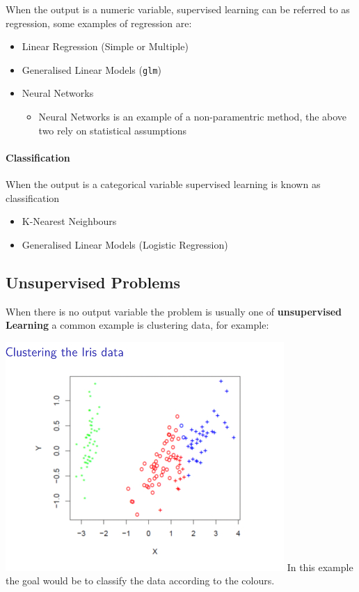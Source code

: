\documentclass[]{book}
\providecommand{\tightlist}{%
  \setlength{\itemsep}{0pt}\setlength{\parskip}{0pt}}
\let\oldparagraph\paragraph
\renewcommand{\paragraph}[1]{\oldparagraph{#1}\mbox{}}
\begin{document}
When the output is a numeric variable, supervised learning can be
referred to as regression, some examples of regression are:

\begin{itemize}
\tightlist
\item
  Linear Regression (Simple or Multiple)
\item
  Generalised Linear Models (\texttt{glm})
\item
  Neural Networks

  \begin{itemize}
  \tightlist
  \item
    Neural Networks is an example of a non-paramentric method, the above
    two rely on statistical assumptions
  \end{itemize}
\end{itemize}

\paragraph{Classification}\label{classification}

When the output is a categorical variable supervised learning is known
as classification

\begin{itemize}
\tightlist
\item
  K-Nearest Neighbours
\item
  Generalised Linear Models (Logistic Regression)
\end{itemize}

\subsection{Unsupervised Problems}\label{unsupervised-problems}

When there is no output variable the problem is usually one of
\textbf{unsupervised Learning} a common example is clustering data, for
example:

\includegraphics{images/clust400px.jpg} In this example the goal would
be to classify the data according to the colours.
\end{document}
